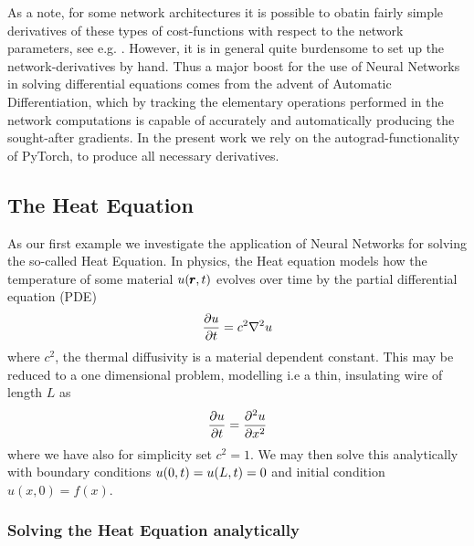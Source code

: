 \documentclass[reprint, english, nofootinbib]{revtex4-2}
\begin{document}

As a note, for some network architectures it is possible to obatin fairly simple derivatives of these types of cost-functions with respect to the network parameters, see e.g. \cite{Lagaris_1998}. However, it is in general quite burdensome to set up the network-derivatives by hand. Thus a major boost for the use of Neural Networks in solving differential equations comes from the advent of Automatic Differentiation, which by tracking the elementary operations performed in the network computations is capable of accurately and automatically producing the sought-after gradients. In the present work we rely on the autograd-functionality of PyTorch, to produce all necessary derivatives.


\subsection{The Heat Equation}

As our first example we investigate the application of Neural Networks for solving the so-called Heat Equation. In physics, the Heat equation models how the temperature of some material $u\qty(\pmb r, t)$ evolves over time by the partial differential equation (PDE)
\begin{equation}
    \pdv{u}{t} = c^2\nabla^2 u 
\end{equation}
where $c^2$, the thermal diffusivity is a material dependent constant. 
This may be reduced to a one dimensional problem, modelling i.e a thin, insulating wire of length $L$ as
\begin{equation}\label{eqn: 1D heat eqn}
    \pdv{u}{t} = \pdv[2]{u}{x}
\end{equation}
where we have also for simplicity set $c^2 = 1$. We may then solve this analytically with boundary conditions $u\qty(0, t) = u\qty(L,t) = 0$ and initial condition $u(x, 0) = f(x)$.

\subsubsection{Solving the Heat Equation analytically}
\noindent 
\end{document}
